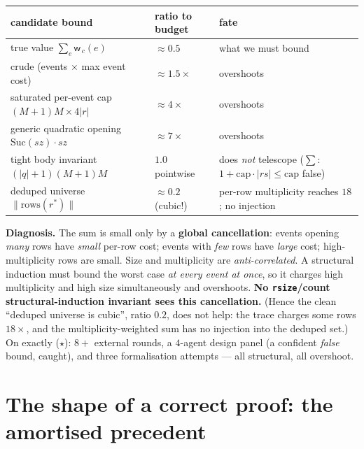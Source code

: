 \documentclass[11pt]{article}
\newcommand{\rs}[1]{\lvert #1\rvert}                 %
\newcommand{\rss}[1]{\lVert #1\rVert}                %
\newcommand{\wt}{\mathsf{w}}                          %
\theoremstyle{definition}
\begin{document}
\begin{center}\small
\begin{tabular}{ll@{\quad}>{\raggedright\arraybackslash}p{5.6cm}}
\textbf{candidate bound} & \textbf{ratio to budget} & \textbf{fate}\\\hline
true value $\sum_e\wt_{\,c}(e)$ & ${\approx}0.5$ & what we must bound\\
crude (events $\times$ max event cost) & ${\approx}1.5\times$ & overshoots\\
saturated per-event cap $(M{+}1)M\times4\rs r$ & ${\approx}4\times$ & overshoots\\
generic quadratic opening $\mathrm{Suc}(sz)\cdot sz$ & ${\approx}7\times$ & overshoots\\
tight body invariant $(\rs q{+}1)(M{+}1)M$ & $1.0$ pointwise & does \emph{not} telescope ($\sum$: $1+\text{cap}\cdot|rs|\le\text{cap}$ false)\\
deduped universe $\rss{\text{rows}(r^{*})}$ & ${\approx}0.2$ (cubic!) & per-row multiplicity reaches $18$; no injection\\
\end{tabular}
\end{center}

\textbf{Diagnosis.} The sum is small only by a \textbf{global cancellation}: events opening \emph{many} rows have
\emph{small} per-row cost; events with \emph{few} rows have \emph{large} cost; high-multiplicity rows are small. Size and
multiplicity are \emph{anti-correlated}. A structural induction must bound the worst case \emph{at every event at once},
so it charges high multiplicity and high size simultaneously and overshoots. \textbf{No \texttt{rsize}/count
structural-induction invariant sees this cancellation.} (Hence the clean ``deduped universe is cubic'', ratio $0.2$,
does not help: the trace charges some rows $18\times$, and the multiplicity-weighted sum has no injection into the
deduped set.) On exactly ($\star$): $8{+}$ external rounds, a $4$-agent design panel (a confident \emph{false} bound,
caught), and three formalisation attempts --- all structural, all overshoot.

\section{The shape of a correct proof: the amortised precedent}\label{sec:amort}
\end{document}
